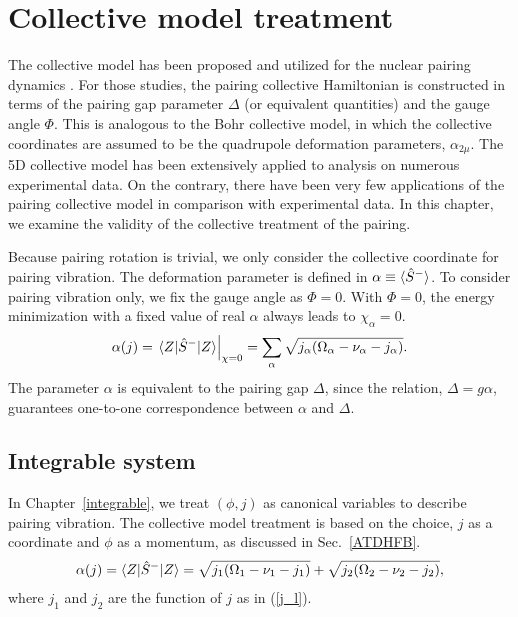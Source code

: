 \documentclass[11pt]{book} %
\begin{document}
\clearpage{\pagestyle{empty}\cleardoublepage}
\chapter{Collective model treatment}
\label{collective}

The collective model has been proposed
and utilized for the nuclear pairing dynamics
\cite{BBPK70,GPBW85, ZPPRS99, P07}.
For those studies, the pairing collective Hamiltonian is constructed
in terms of the pairing gap parameter $\Delta$ (or equivalent quantities) 
and the gauge angle $\Phi$.  
This is analogous to the Bohr collective model,
in which the collective coordinates are assumed to be the
quadrupole deformation parameters, $\alpha_{2\mu}$.
The 5D collective model has been 
extensively applied to analysis on numerous experimental data.
On the contrary, there have been very few applications of
the pairing collective model
in comparison with experimental data.
In this chapter, we examine the validity of
the collective treatment of the pairing.

Because pairing rotation is trivial, we only consider the collective coordinate for pairing vibration. The deformation parameter is defined in $\alpha\equiv \braket{ \hat{S}^- }$. 
To consider pairing vibration only, we fix the gauge angle as $\Phi=0$.
With $\Phi=0$, the energy minimization with a fixed value of real $\alpha$ always
leads to $\chi_{\alpha}=0$.
\begin{align}
\alpha(j) = \left. \braket{Z|\hat{S}^-|Z} \right|_{\chi=0}
	= \sum_{\alpha} \sqrt{j_{\alpha}(\Omega_{\alpha}-\nu_{\alpha}-j_{\alpha})} .
 \label{Delta}
\end{align}
The parameter $\alpha$ is equivalent to the pairing gap $\Delta$,
since the relation, $\Delta=g\alpha$,
guarantees one-to-one correspondence between $\alpha$ and $\Delta$. 

\section{Integrable system}
In Chapter~\ref{integrable}, we treat $(\phi, j)$ as canonical variables to describe pairing vibration.
The collective model treatment is based on the choice,
$j$ as a coordinate and $\phi$ as a momentum, as discussed in Sec.~\ref{ATDHFB}.
\begin{align}
\alpha(j) = \braket{Z|\hat{S}^-|Z}
	= \sqrt{j_1(\Omega_1-\nu_1-j_1)} +\sqrt{j_2(\Omega_2-\nu_2-j_2)},
 \label{Delta_BCS}
\end{align}
where $j_1$ and $j_2$ are the function of $j$ as in (\ref{j_l}).
\end{document}

